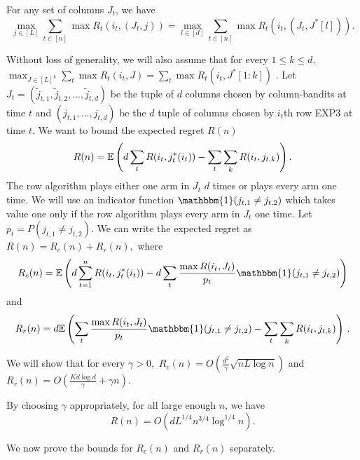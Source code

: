 \begin{lemma}
\label{thm:hott}
For any set of columns $J_t$, we have 
$$ \max_{j \in [L]} \sum_{t \in [n]} \max R_t(i_t, (J_t,j)) = \max_{l \in [d]} \sum_{t \in [n]} \max R_t(i_t, (J_t,J^*[l])).$$
\end{lemma}
Without loss of generality, we will also assume that for every $1 \leq k \leq d,$ $\max_{J \in [L]^k} \sum_t \max R_t(i_t,J) = \sum_t \max R_t(i_t,J^*[1:k])$ .  Let $J_t = (\tilde{j}_{t,1},\tilde{j}_{t,2},...,\tilde{j}_{t,d})$ be the tuple of $d$ columns chosen by column-bandits at time $t$ and $(j_{t,1},...,j_{t,d})$ be the $d$ tuple of columns chosen by $i_t$th row EXP3 at time $t.$ We want to bound the expected regret $R(n)$  
$$R(n) = \mathbb{E} \left( d\sum_{t } R(i_t,j^*_t(i_t)) - \sum_{t} \sum_k R(i_t,j_{t,k}) \right).$$
 The row algorithm plays either one arm in $J_t$ $d$ times or plays every arm one time. We will use an indicator function $\mathbbm{1}(j_{t,1} \neq j_{t,2})$ which takes value one only if the row algorithm  plays every arm in $J_t$ one time. Let $p_t = P(j_{t, 1} \neq j_{t, 2})$. We can write the expected regret as 
$R(n) = R_c(n) + R_r(n),$ where
\begin{align*}
  R_c(n) = \E \left( d\sum_{t = 1}^{n} R(i_t,j^*_t(i_t)) - d\sum_{t} \frac{\max R(i_t,J_t)}{p_t} \mathbbm{1}(j_{t,1} \neq j_{t,2})  \right)
\end{align*}
and
\begin{align*}
  R_r(n) = d \E \left( \sum_{t} \frac{ \max R(i_t,J_t)}{p_t} \mathbbm{1}(j_{t,1} \neq j_{t,2}) - \sum_{t} \sum_k R(i_t,j_{t,k}) \right)\,.
\end{align*}
  
We will show that for every $\gamma > 0,$   
$R_c(n) =  O \left( \frac{d^2}{\gamma} \sqrt {n L \log n} \right)$
and $R_r(n) =O \left( \frac{K d\log d}{\gamma} + \gamma n  \right) .$ 
\begin{theorem}
By choosing $\gamma$ appropriately, for all large enough $n$, we have 
$$R(n) = O\left( d L^{1/4} n^{3/4} \log^{1/4} n\right) .$$
\end{theorem}
We now prove the bounds for $R_c(n)$ and $R_r(n)$ separately.

